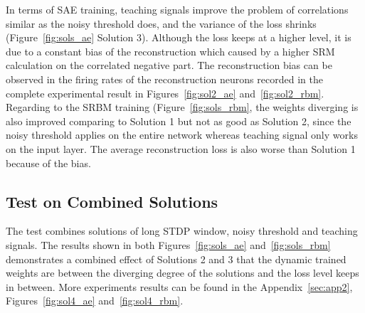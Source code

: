 In terms of SAE training, teaching signals improve the problem of correlations similar as the noisy threshold does, and the variance of the loss shrinks (Figure~\ref{fig:sols_ae} Solution 3).
Although the loss keeps at a higher level, it is due to a constant bias of the reconstruction which caused by a higher SRM calculation on the correlated negative part.
The reconstruction bias can be observed in the firing rates of the reconstruction neurons recorded in the complete experimental result in Figures~\ref{fig:sol2_ae} and~\ref{fig:sol2_rbm}.
Regarding to the SRBM training (Figure~\ref{fig:sols_rbm}, the weights diverging is also improved comparing to Solution 1 but not as good as Solution 2, since the noisy threshold applies on the entire network whereas teaching signal only works on the input layer.
The average reconstruction loss is also worse than Solution 1 because of the bias. 

\subsection{Test on Combined Solutions}
The test combines solutions of long STDP window, noisy threshold and teaching signals.
The results shown in both Figures~\ref{fig:sols_ae} and~\ref{fig:sols_rbm} demonstrates a combined effect of Solutions 2 and 3 that the dynamic trained weights are between the diverging degree of the solutions and the loss level keeps in between.
More experiments results can be found in the Appendix~\ref{sec:app2}, Figures~\ref{fig:sol4_ae} and~\ref{fig:sol4_rbm}.


